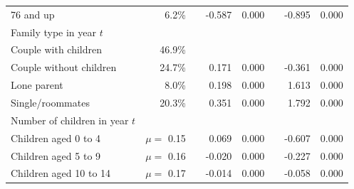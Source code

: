 \begin{table}[H]
\begin{adjustwidth}{-1in}{-1in}
\begin{tabular}{lrrrrrrr}
		\hspace{2mm} 76 and up                                 & 6.2\%   &  & -0.587                   & 0.000                 &                      & -0.895                   & 0.000                 \\
		Family type in year $t$                     &         &  &                          &                       &                      &                          &                       \\
		\hspace{2mm} Couple with children                      & 46.9\%  &  &                          &                       &                      &                          &                       \\
		\hspace{2mm} Couple without children           & 24.7\%  &  & 0.171                    & 0.000                 &                      & -0.361                   & 0.000                 \\
		\hspace{2mm} Lone parent           & 8.0\%   &  & 0.198                    & 0.000                 &                      & 1.613                    & 0.000                 \\
		\hspace{2mm} Single/roommates              & 20.3\%  &  & 0.351                    & 0.000                 &                      & 1.792                    & 0.000                 \\
		Number of children in year $t$              &         &  &                          &                       &                      &                          &                       \\
		\hspace{2mm} Children aged 0 to 4                      & $\mu = $ 0.15    &  & 0.069                    & 0.000                 &                      & -0.607                   & 0.000                 \\
		\hspace{2mm} Children aged 5 to 9                      & $\mu = $ 0.16    &  & -0.020                   & 0.000                 &                      & -0.227                   & 0.000                 \\
		\hspace{2mm} Children aged 10 to 14                    & $\mu = $ 0.17    &  & -0.014                   & 0.000                 &                      & -0.058                   & 0.000                 \\

\end{tabular}
\end{adjustwidth}
\end{table}
